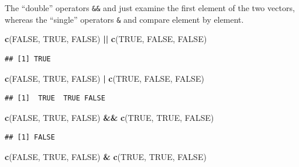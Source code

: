 \documentclass[
]{krantz}
\newenvironment{Shaded}{\begin{snugshade}}{\end{snugshade}}
\newcommand{\KeywordTok}[1]{\textcolor[rgb]{0.13,0.29,0.53}{\textbf{#1}}}
\newcommand{\NormalTok}[1]{#1}
\newcommand{\OperatorTok}[1]{\textcolor[rgb]{0.81,0.36,0.00}{\textbf{#1}}}
\newcommand{\OtherTok}[1]{\textcolor[rgb]{0.56,0.35,0.01}{#1}}
\newcommand{\StringTok}[1]{\textcolor[rgb]{0.31,0.60,0.02}{#1}}
\begin{document}
The ``double'' operators \texttt{\&\&} and \texttt{\textbar{}\textbar{}} just examine the first element of the two vectors, whereas the ``single'' operators \texttt{\&} and \texttt{\textbar{}} compare element by element.

\begin{Shaded}
\begin{Highlighting}[]
\KeywordTok{c}\NormalTok{(}\OtherTok{FALSE}\NormalTok{, }\OtherTok{TRUE}\NormalTok{, }\OtherTok{FALSE}\NormalTok{) }\OperatorTok{||}\StringTok{ }\KeywordTok{c}\NormalTok{(}\OtherTok{TRUE}\NormalTok{, }\OtherTok{FALSE}\NormalTok{, }\OtherTok{FALSE}\NormalTok{)}
\end{Highlighting}
\end{Shaded}

\begin{verbatim}
## [1] TRUE
\end{verbatim}

\begin{Shaded}
\begin{Highlighting}[]
\KeywordTok{c}\NormalTok{(}\OtherTok{FALSE}\NormalTok{, }\OtherTok{TRUE}\NormalTok{, }\OtherTok{FALSE}\NormalTok{) }\OperatorTok{|}\StringTok{ }\KeywordTok{c}\NormalTok{(}\OtherTok{TRUE}\NormalTok{, }\OtherTok{FALSE}\NormalTok{, }\OtherTok{FALSE}\NormalTok{)}
\end{Highlighting}
\end{Shaded}

\begin{verbatim}
## [1]  TRUE  TRUE FALSE
\end{verbatim}

\begin{Shaded}
\begin{Highlighting}[]
\KeywordTok{c}\NormalTok{(}\OtherTok{FALSE}\NormalTok{, }\OtherTok{TRUE}\NormalTok{, }\OtherTok{FALSE}\NormalTok{) }\OperatorTok{\&\&}\StringTok{ }\KeywordTok{c}\NormalTok{(}\OtherTok{TRUE}\NormalTok{, }\OtherTok{TRUE}\NormalTok{, }\OtherTok{FALSE}\NormalTok{)}
\end{Highlighting}
\end{Shaded}

\begin{verbatim}
## [1] FALSE
\end{verbatim}

\begin{Shaded}
\begin{Highlighting}[]
\KeywordTok{c}\NormalTok{(}\OtherTok{FALSE}\NormalTok{, }\OtherTok{TRUE}\NormalTok{, }\OtherTok{FALSE}\NormalTok{) }\OperatorTok{\&}\StringTok{ }\KeywordTok{c}\NormalTok{(}\OtherTok{TRUE}\NormalTok{, }\OtherTok{TRUE}\NormalTok{, }\OtherTok{FALSE}\NormalTok{)}
\end{Highlighting}
\end{Shaded}
\end{document}
